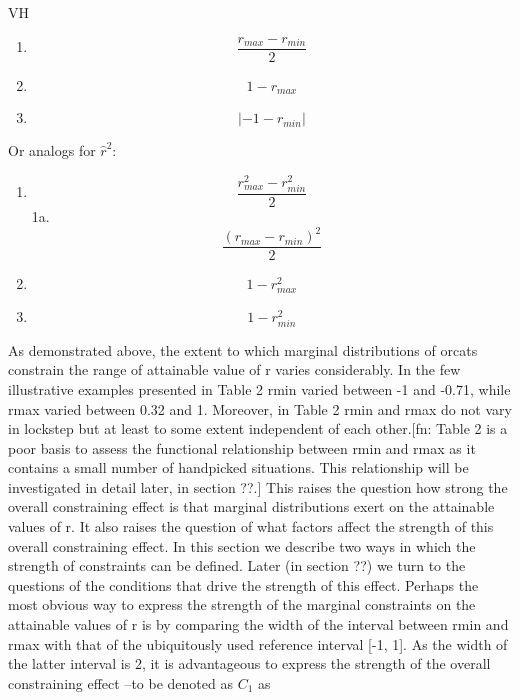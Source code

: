 \documentclass[
  12pt,
]{article}
\providecommand{\tightlist}{%
  \setlength{\itemsep}{0pt}\setlength{\parskip}{0pt}}
\theoremstyle{plain}
\theoremstyle{definition}
\theoremstyle{remark}
\begin{document}
VH

\begin{enumerate}
\def\labelenumi{\arabic{enumi}.}
\tightlist
\item
  \[\frac{ r_{max}-r_{min}}{2}\]
\item
  \[1-r_{max}\]
\item
  \[|-1-r_{min}|\]
\end{enumerate}

Or analogs for \(\hat{r}^2\):

\begin{enumerate}
\def\labelenumi{\arabic{enumi}.}
\tightlist
\item
  \[\frac{ r_{max}^2-r_{min}^2}{2}\] 1a.
  \[\frac{ (r_{max}-r_{min})^2}{2}\]
\item
  \[1-r_{max}^2\]
\item
  \[1-r_{min}^2\]
\end{enumerate}

As demonstrated above, the extent to which marginal distributions of
orcats constrain the range of attainable value of r varies considerably.
In the few illustrative examples presented in Table 2 rmin varied
between -1 and -0.71, while rmax varied between 0.32 and 1. Moreover, in
Table 2 rmin and rmax do not vary in lockstep but at least to some
extent independent of each other.{[}fn: Table 2 is a poor basis to
assess the functional relationship between rmin and rmax as it contains
a small number of handpicked situations. This relationship will be
investigated in detail later, in section ??.{]} This raises the question
how strong the overall constraining effect is that marginal
distributions exert on the attainable values of r. It also raises the
question of what factors affect the strength of this overall
constraining effect. In this section we describe two ways in which the
strength of constraints can be defined. Later (in section ??) we turn to
the questions of the conditions that drive the strength of this effect.
Perhaps the most obvious way to express the strength of the marginal
constraints on the attainable values of r is by comparing the width of
the interval between rmin and rmax with that of the ubiquitously used
reference interval {[}-1, 1{]}. As the width of the latter interval is
2, it is advantageous to express the strength of the overall
constraining effect --to be denoted as \(C_1\) as
\end{document}
